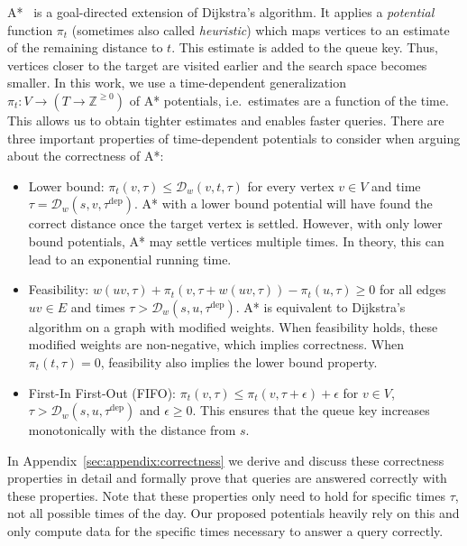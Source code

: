 \documentclass[a4paper,UKenglish,cleveref, autoref, thm-restate,anonymous]{lipics-v2021}
\newcommand*{\dist}{\mathcal{D}}
\newcommand*{\tdep}{\tau^{\operatorname{dep}}}
\begin{document}
A*~\cite{hnr-afbhd-68} is a goal-directed extension of Dijkstra's algorithm.
It applies a \emph{potential} function $\pi_t$ (sometimes also called \emph{heuristic}) which maps vertices to an estimate of the remaining distance to $t$.
This estimate is added to the queue key.
Thus, vertices closer to the target are visited earlier and the search space becomes smaller.
%
In this work, we use a time-dependent generalization $\pi_t : V \to (T \to \mathbb{Z}^{\geq 0})$ of A* potentials, i.e.\ estimates are a function of the time.
This allows us to obtain tighter estimates and enables faster queries.
There are three important properties of time-dependent potentials to consider when arguing about the correctness of A*:
\begin{itemize}
  \item Lower bound: $\pi_t(v, \tau) \leq \dist_w(v,t,\tau)$ for every vertex $v \in V$ and time $\tau = \dist_w(s,v,\tdep)$.
  A* with a lower bound potential will have found the correct distance once the target vertex is settled.
  However, with only lower bound potentials, A* may settle vertices multiple times.
  In theory, this can lead to an exponential running time.
  \item Feasibility: $w(uv, \tau) + \pi_t(v, \tau + w(uv, \tau)) - \pi_t(u, \tau) \geq 0$ for all edges $uv \in E$ and times $\tau > \dist_w(s,u,\tdep)$.
  A* is equivalent to Dijkstra's algorithm on a graph with modified weights.
  When feasibility holds, these modified weights are non-negative, which implies correctness.
  When $\pi_t(t, \tau) = 0$, feasibility also implies the lower bound property.
  \item First-In First-Out (FIFO): $\pi_t(v, \tau) \leq \pi_t(v, \tau + \epsilon) + \epsilon$ for $v \in V$, $\tau > \dist_w(s,u,\tdep)$ and $\epsilon \geq 0$.
  This ensures that the queue key increases monotonically with the distance from $s$.
\end{itemize}
In Appendix~\ref{sec:appendix:correctness} we derive and discuss these correctness properties in detail and formally prove that queries are answered correctly with these properties.
Note that these properties only need to hold for specific times $\tau$, not all possible times of the day.
Our proposed potentials heavily rely on this and only compute data for the specific times necessary to answer a query correctly.
\end{document}
